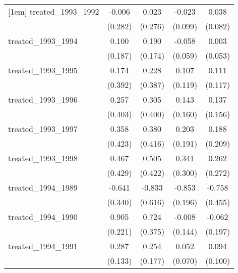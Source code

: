 {\begin{tabular}{l*{4}{c}}
[1em]
treated\_1993\_1992&      -0.006         &       0.023         &      -0.023         &       0.038         \\
            &     (0.282)         &     (0.276)         &     (0.099)         &     (0.082)         \\
[1em]
treated\_1993\_1994&       0.100         &       0.190         &      -0.058         &       0.003         \\
            &     (0.187)         &     (0.174)         &     (0.059)         &     (0.053)         \\
[1em]
treated\_1993\_1995&       0.174         &       0.228         &       0.107         &       0.111         \\
            &     (0.392)         &     (0.387)         &     (0.119)         &     (0.117)         \\
[1em]
treated\_1993\_1996&       0.257         &       0.305         &       0.143         &       0.137         \\
            &     (0.403)         &     (0.400)         &     (0.160)         &     (0.156)         \\
[1em]
treated\_1993\_1997&       0.358         &       0.380         &       0.203         &       0.188         \\
            &     (0.423)         &     (0.416)         &     (0.191)         &     (0.209)         \\
[1em]
treated\_1993\_1998&       0.467         &       0.505         &       0.341         &       0.262         \\
            &     (0.429)         &     (0.422)         &     (0.300)         &     (0.272)         \\
[1em]
treated\_1994\_1989&      -0.641         &      -0.833         &      -0.853\sym{***}&      -0.758         \\
            &     (0.340)         &     (0.616)         &     (0.196)         &     (0.455)         \\
[1em]
treated\_1994\_1990&       0.905\sym{***}&       0.724         &      -0.008         &      -0.062         \\
            &     (0.221)         &     (0.375)         &     (0.144)         &     (0.197)         \\
[1em]
treated\_1994\_1991&       0.287\sym{*}  &       0.254         &       0.052         &       0.094         \\
            &     (0.133)         &     (0.177)         &     (0.070)         &     (0.100)         \\

\end{tabular}}
